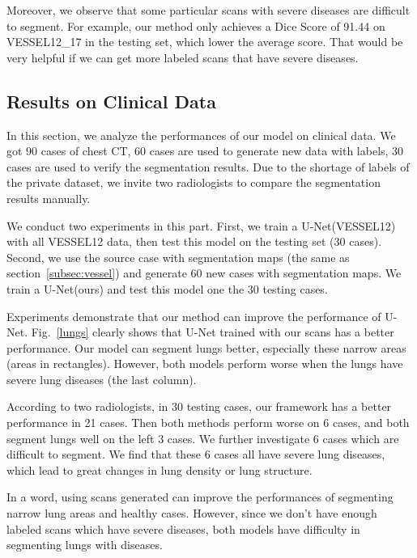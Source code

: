 \documentclass{article}
\begin{document}
Moreover, we observe that some particular scans with severe diseases are difficult to segment. For example, our method only achieves a Dice Score of 91.44 on VESSEL12\_17 in the testing set, which lower the average score. That would be very helpful if we can get more labeled scans that have severe diseases.

\subsection{Results on Clinical Data}
\label{subsec:clinical}
In this section, we analyze the performances of our model on clinical data. We got 90 cases of chest CT, 60 cases are used to generate new data with labels, 30 cases are used to verify the segmentation results. Due to the shortage of labels of the private dataset, we invite two radiologists to compare the segmentation results manually.


We conduct two experiments in this part.
First, we train a U-Net(VESSEL12) with all VESSEL12 data, then test this model on the testing set (30 cases).
Second, we use the source case with segmentation maps (the same as section~\ref{subsec:vessel}) and generate 60 new cases with segmentation maps. We train a U-Net(ours) and test this model one the 30 testing cases.

Experiments demonstrate that our method can improve the performance of U-Net. Fig.~\ref{lungs} clearly shows that U-Net trained with our scans has a better performance. Our model can segment lungs better, especially these narrow areas (areas in rectangles). However, both models perform worse when the lungs have severe lung diseases (the last column).

According to two radiologists, in 30 testing cases, our framework has a better performance in 21 cases. Then both methods perform worse on 6 cases, and both segment lungs well on the left 3 cases.
We further investigate 6 cases which are difficult to segment. We find that these 6 cases all have severe lung diseases, which lead to great changes in lung density or lung structure. 

In a word, using scans generated can improve the performances of segmenting narrow lung areas and healthy cases. However, since we don't have enough labeled scans which have severe diseases, both models have difficulty in segmenting lungs with diseases.
\end{document}
